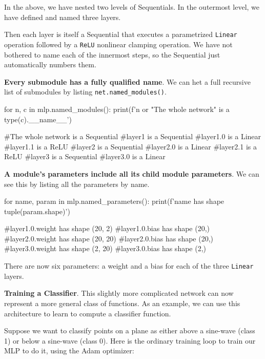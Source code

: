 In the above, we have nested two levels of Sequentials. In the outermost level, we have defined and named three layers. 

Then each layer is itself a Sequential that executes a parametrized \texttt{Linear} operation followed by a \texttt{ReLU} nonlinear clamping operation. We have not bothered to name each of the innermost steps, so the Sequential just automatically numbers them. 

\textbf{Every submodule has a fully qualified name}. We can het a full recursive list of submodules by listing \texttt{net.named\_modules()}. 

\begin{codeblock}[language=python]
for n, c in mlp.named_modules():
print(f'{n or "The whole network"} is a {type(c).__name__}')

#The whole network is a Sequential
#layer1 is a Sequential
#layer1.0 is a Linear
#layer1.1 is a ReLU
#layer2 is a Sequential
#layer2.0 is a Linear
#layer2.1 is a ReLU
#layer3 is a Sequential
#layer3.0 is a Linear

\end{codeblock}

\textbf{A module's parameters include all its child module parameters}. We can see this by listing all the parameters by name. 

\begin{codeblock}[language=python]
for name, param in mlp.named_parameters():
print(f'{name} has shape {tuple(param.shape)}')

#layer1.0.weight has shape (20, 2)
#layer1.0.bias has shape (20,)
#layer2.0.weight has shape (20, 20)
#layer2.0.bias has shape (20,)
#layer3.0.weight has shape (2, 20)
#layer3.0.bias has shape (2,)
\end{codeblock}

There are now six parameters: a weight and a bias for each of the three \texttt{Linear} layers. 

\textbf{Training a Classifier}. This slightly more complicated network can now represent a more general class of functions. As an example, we can use this architecture to learn to compute a classifier function. 

Suppose we want to classify points on a plane as either above a sine-wave (class 1) or below a sine-wave (class 0). Here is the ordinary training loop to train our MLP to do it, using the Adam optimizer:

